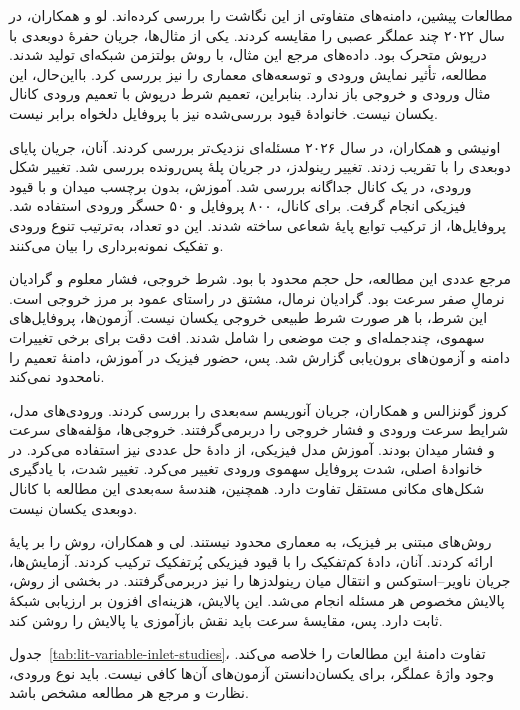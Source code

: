 مطالعات پیشین، دامنه‌های متفاوتی از این نگاشت را بررسی کرده‌اند.
لو و همکاران، در سال ۲۰۲۲ چند عملگر عصبی را مقایسه کردند.
یکی از مثال‌ها، جریان حفرهٔ دوبعدی با درپوش متحرک بود.
داده‌های مرجع این مثال، با روش بولتزمن شبکه‌ای تولید شدند.
مطالعه، تأثیر نمایش ورودی و توسعه‌های معماری را نیز بررسی کرد.
بااین‌حال، این مثال ورودی و خروجی باز ندارد.
بنابراین، تعمیم شرط درپوش با تعمیم ورودی کانال یکسان نیست.
خانوادهٔ قیود بررسی‌شده نیز با پروفایل دلخواه برابر نیست.
\cite{Lu2022FairComparison}

اونیشی و همکاران، در سال ۲۰۲۶ مسئله‌ای نزدیک‌تر بررسی کردند.
آنان، جریان پایای دوبعدی را با  تقریب زدند.
تغییر رینولدز، در جریان پلهٔ پس‌رونده بررسی شد.
تغییر شکل ورودی، در یک کانال جداگانه بررسی شد.
آموزش، بدون برچسب میدان و با قیود فیزیکی انجام گرفت.
برای کانال، ۸۰۰ پروفایل و ۵۰ حسگر ورودی استفاده شد.
پروفایل‌ها، از ترکیب توابع پایهٔ شعاعی ساخته شدند.
این دو تعداد، به‌ترتیب تنوع ورودی و تفکیک نمونه‌برداری را بیان می‌کنند.
\cite{Onishi2026FlowConditions}

مرجع عددی این مطالعه، حل حجم محدود با  بود.
شرط خروجی، فشار معلوم و گرادیان نرمالِ صفر سرعت بود.
گرادیان نرمال، مشتق در راستای عمود بر مرز خروجی است.
این شرط، با هر صورت شرط طبیعی خروجی یکسان نیست.
آزمون‌ها، پروفایل‌های سهموی، چندجمله‌ای و جت موضعی را شامل شدند.
افت دقت برای برخی تغییرات دامنه و آزمون‌های برون‌یابی گزارش شد.
پس، حضور فیزیک در آموزش، دامنهٔ تعمیم را نامحدود نمی‌کند.
\cite{Onishi2026FlowConditions}

کروز گونزالس و همکاران، جریان آنوریسم سه‌بعدی را بررسی کردند.
ورودی‌های مدل، شرایط سرعت ورودی و فشار خروجی را دربرمی‌گرفتند.
خروجی‌ها، مؤلفه‌های سرعت و فشار میدان بودند.
آموزش مدل فیزیکی، از دادهٔ حل عددی نیز استفاده می‌کرد.
در خانوادهٔ اصلی، شدت پروفایل سهموی ورودی تغییر می‌کرد.
تغییر شدت، با یادگیری شکل‌های مکانی مستقل تفاوت دارد.
همچنین، هندسهٔ سه‌بعدی این مطالعه با کانال دوبعدی یکسان نیست.
\cite{CruzGonzalez2026Vascular}

روش‌های مبتنی بر فیزیک، به معماری  محدود نیستند.
لی و همکاران، روش  را بر پایهٔ  ارائه کردند.
آنان، دادهٔ کم‌تفکیک را با قیود فیزیکی پُرتفکیک ترکیب کردند.
آزمایش‌ها، جریان ناویر--استوکس و انتقال میان رینولدزها را نیز دربرمی‌گرفتند.
در بخشی از روش، پالایش مخصوص هر مسئله انجام می‌شد.
این پالایش، هزینه‌ای افزون بر ارزیابی شبکهٔ ثابت دارد.
پس، مقایسهٔ سرعت باید نقش بازآموزی یا پالایش را روشن کند.
\cite{Li2024PINO}

جدول~\ref{tab:lit-variable-inlet-studies}، تفاوت دامنهٔ این مطالعات را خلاصه می‌کند.
وجود واژهٔ عملگر، برای یکسان‌دانستن آزمون‌های آن‌ها کافی نیست.
باید نوع ورودی، نظارت و مرجع هر مطالعه مشخص باشد.

